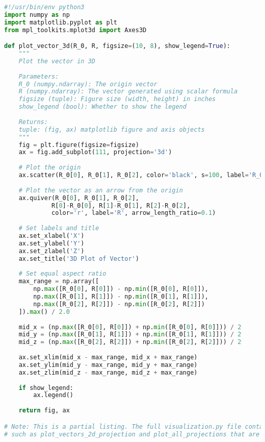 \begin{lstlisting}[language=Python]
#!/usr/bin/env python3
import numpy as np
import matplotlib.pyplot as plt
from mpl_toolkits.mplot3d import Axes3D

def plot_vector_3d(R_0, R, figsize=(10, 8), show_legend=True):
    """
    Plot the vector in 3D
    
    Parameters:
    R_0 (numpy.ndarray): The origin vector
    R (numpy.ndarray): The vector generated using scalar formula
    figsize (tuple): Figure size (width, height) in inches
    show_legend (bool): Whether to show the legend
    
    Returns:
    tuple: (fig, ax) matplotlib figure and axis objects
    """
    fig = plt.figure(figsize=figsize)
    ax = fig.add_subplot(111, projection='3d')
    
    # Plot the origin
    ax.scatter(R_0[0], R_0[1], R_0[2], color='black', s=100, label='R_0')
    
    # Plot the vector as an arrow from the origin
    ax.quiver(R_0[0], R_0[1], R_0[2], 
             R[0]-R_0[0], R[1]-R_0[1], R[2]-R_0[2], 
             color='r', label='R', arrow_length_ratio=0.1)
    
    # Set labels and title
    ax.set_xlabel('X')
    ax.set_ylabel('Y')
    ax.set_zlabel('Z')
    ax.set_title('3D Plot of Vector')
    
    # Set equal aspect ratio
    max_range = np.array([
        np.max([R_0[0], R[0]]) - np.min([R_0[0], R[0]]),
        np.max([R_0[1], R[1]]) - np.min([R_0[1], R[1]]),
        np.max([R_0[2], R[2]]) - np.min([R_0[2], R[2]])
    ]).max() / 2.0
    
    mid_x = (np.max([R_0[0], R[0]]) + np.min([R_0[0], R[0]])) / 2
    mid_y = (np.max([R_0[1], R[1]]) + np.min([R_0[1], R[1]])) / 2
    mid_z = (np.max([R_0[2], R[2]]) + np.min([R_0[2], R[2]])) / 2
    
    ax.set_xlim(mid_x - max_range, mid_x + max_range)
    ax.set_ylim(mid_y - max_range, mid_y + max_range)
    ax.set_zlim(mid_z - max_range, mid_z + max_range)
    
    if show_legend:
        ax.legend()
    
    return fig, ax

# Note: This is a partial listing. The full visualization.py file contains additional functions
# such as plot_vectors_2d_projection and plot_all_projections that are omitted here for brevity.
\end{lstlisting}

